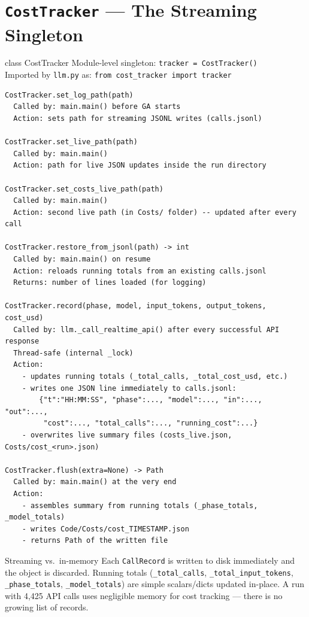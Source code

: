 \documentclass[11pt,a4paper]{report}
\newcommand{\pyfile}[1]{\texttt{#1}}
\newcommand{\fn}[1]{\texttt{#1}}
\begin{document}
\section{\fn{CostTracker} --- The Streaming Singleton}

\begin{specbox}{class CostTracker}
Module-level singleton: \fn{tracker = CostTracker()}\\
Imported by \pyfile{llm.py} as: \fn{from cost\_tracker import tracker}
\end{specbox}

\begin{lstlisting}[style=chain]
CostTracker.set_log_path(path)
  Called by: main.main() before GA starts
  Action: sets path for streaming JSONL writes (calls.jsonl)

CostTracker.set_live_path(path)
  Called by: main.main()
  Action: path for live JSON updates inside the run directory

CostTracker.set_costs_live_path(path)
  Called by: main.main()
  Action: second live path (in Costs/ folder) -- updated after every call

CostTracker.restore_from_jsonl(path) -> int
  Called by: main.main() on resume
  Action: reloads running totals from an existing calls.jsonl
  Returns: number of lines loaded (for logging)

CostTracker.record(phase, model, input_tokens, output_tokens, cost_usd)
  Called by: llm._call_realtime_api() after every successful API response
  Thread-safe (internal _lock)
  Action:
    - updates running totals (_total_calls, _total_cost_usd, etc.)
    - writes one JSON line immediately to calls.jsonl:
        {"t":"HH:MM:SS", "phase":..., "model":..., "in":..., "out":...,
         "cost":..., "total_calls":..., "running_cost":...}
    - overwrites live summary files (costs_live.json, Costs/cost_<run>.json)

CostTracker.flush(extra=None) -> Path
  Called by: main.main() at the very end
  Action:
    - assembles summary from running totals (_phase_totals, _model_totals)
    - writes Code/Costs/cost_TIMESTAMP.json
    - returns Path of the written file
\end{lstlisting}

\begin{conceptbox}{Streaming vs.\ in-memory}
Each \fn{CallRecord} is written to disk immediately and the object is discarded.
Running totals (\fn{\_total\_calls}, \fn{\_total\_input\_tokens}, \fn{\_phase\_totals},
\fn{\_model\_totals}) are simple scalars/dicts updated in-place.  A run with 4,425 API
calls uses negligible memory for cost tracking --- there is no growing list of records.
\end{conceptbox}
\end{document}

